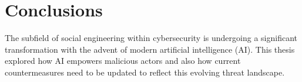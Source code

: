 



\chapter{Conclusions\label{chapter:conclusions}}

\begin{comment}

Guides:
    - 1 to 3 pages max?

TODO:
    [ ] How AI has augmented SE attacks and countermeasures
    [ ] Gap in the literature

What to cover:
    - How AI has augmented SE attacks and countermeasures
    - Gap in the literature regarding SE and AI intersection?
    - Analysis on where AI-powered SE attacks might be headed in the future
        - Also about robotics and human-like actors
    - What organizations and individuals need to do regarding the evolving landscape of SE attacks

Speculation:
    - Drones dropping USB thumbdrives?
    - Human-like android as threat actors
    - Impact of robotics on dumpster diving, shoulder surfing and baiting
    
Literature:
    - Gen and detection of deepfakes

From training material:
    - "Yhteenveto vaatimattomimmillaan on vain lyhyt kertaus kirjoituksen keskeisistä asioista. Arvokkaamman yhteenvedon saa aikaan kommentoimalla työn tulosten arvoa, työn liittymistä ympäristöön ja tulevaisuudennäkymiä. Tällaiset arviot huolellisesti perusteltava."
    - "Yhteenvetoluku kuvaa teknisten johtopäätösten tuomaa impaktia"

\end{comment}

The subfield of social engineering within cybersecurity is undergoing a significant transformation with the advent of modern artificial intelligence (AI). This thesis explored how AI empowers malicious actors and also how current countermeasures need to be updated to reflect this evolving threat landscape.



